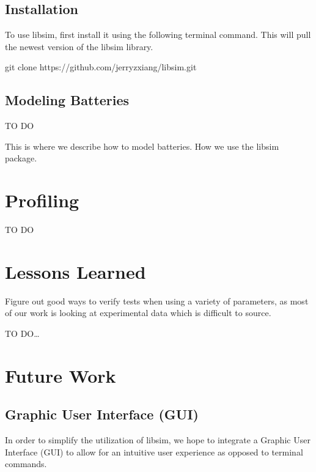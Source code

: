\documentclass[letterpaper,10pt,english]{sphinxmanual}
\begin{document}
\section{Installation}
\label{\detokenize{usage:installation}}\label{\detokenize{usage:id1}}
\sphinxAtStartPar
To use libsim, first install it using the following terminal command. This will
pull the newest version of the libsim library.

\begin{sphinxVerbatim}[commandchars=\\\{\}]
git clone https://github.com/jerryzxiang/libsim.git
\end{sphinxVerbatim}


\section{Modeling Batteries}
\label{\detokenize{usage:modeling-batteries}}
\sphinxAtStartPar
TO DO

\sphinxAtStartPar
This is where we describe how to model batteries. How we use the libsim package.


\chapter{Profiling}
\label{\detokenize{profiling:profiling}}\label{\detokenize{profiling::doc}}
\sphinxAtStartPar
TO DO


\chapter{Lessons Learned}
\label{\detokenize{lessons_learned:lessons-learned}}\label{\detokenize{lessons_learned::doc}}
\sphinxAtStartPar
Figure out good ways to verify tests when using a variety of parameters,
as most of our work is looking at experimental data which is difficult to source.

\sphinxAtStartPar
TO DO…


\chapter{Future Work}
\label{\detokenize{future:future-work}}\label{\detokenize{future::doc}}

\section{Graphic User Interface (GUI)}
\label{\detokenize{future:graphic-user-interface-gui}}
\sphinxAtStartPar
In order to simplify the utilization of libsim, we hope to integrate
a Graphic User Interface (GUI) to allow for an intuitive user
experience as opposed to terminal commands.
\end{document}

